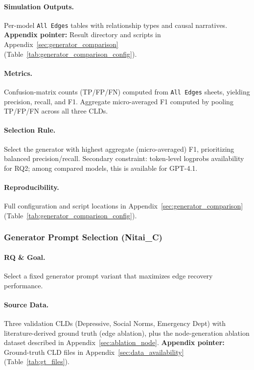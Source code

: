\paragraph{Simulation Outputs.}
Per-model \texttt{All Edges} tables with relationship types and causal narratives.
\textbf{Appendix pointer:} Result directory and scripts in Appendix~\ref{sec:generator_comparison} (Table~\ref{tab:generator_comparison_config}).

\paragraph{Metrics.}
Confusion-matrix counts (TP/FP/FN) computed from \texttt{All Edges} sheets, yielding precision, recall, and F1. Aggregate micro-averaged F1 computed by pooling TP/FP/FN across all three CLDs.

\paragraph{Selection Rule.}
Select the generator with highest aggregate (micro-averaged) F1, prioritizing balanced precision/recall. Secondary constraint: token-level logprobs availability for RQ2; among compared models, this is available for GPT-4.1.

\paragraph{Reproducibility.}
Full configuration and script locations in Appendix~\ref{sec:generator_comparison} (Table~\ref{tab:generator_comparison_config}).

\subsubsection{Generator Prompt Selection (Nitai\_C)}

\paragraph{RQ \& Goal.}
Select a fixed generator prompt variant that maximizes edge recovery performance.

\paragraph{Source Data.}
Three validation CLDs (Depressive, Social Norms, Emergency Dept) with literature-derived ground truth (edge ablation), plus the node-generation ablation dataset described in Appendix~\ref{sec:ablation_node}.
\textbf{Appendix pointer:} Ground-truth CLD files in Appendix~\ref{sec:data_availability} (Table~\ref{tab:gt_files}).

